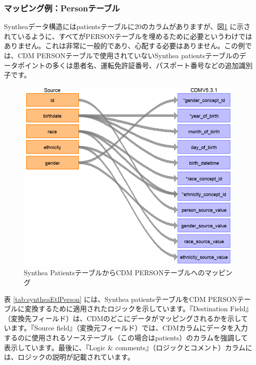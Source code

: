 \documentclass[
  11pt]{book}
\theoremstyle{definition}
\theoremstyle{definition}
\theoremstyle{definition}
\theoremstyle{definition}
\theoremstyle{remark}
\begin{document}
\subsubsection*{マッピング例：Personテーブル}\label{ux30deux30c3ux30d4ux30f3ux30b0ux4f8bpersonux30c6ux30fcux30d6ux30eb}

Syntheaデータ構造にはpatientsテーブルに20のカラムがありますが、図\ref{fig:syntheaPerson} に示されているように、すべてがPERSONテーブルを埋めるために必要というわけではありません。これは非常に一般的であり、心配する必要はありません。この例では、CDM PERSONテーブルで使用されていないSynthea patientsテーブルのデータポイントの多くは患者名、運転免許証番号、パスポート番号などの追加識別子です。

\begin{figure}

{\centering \includegraphics[width=1\linewidth]{images/ExtractTransformLoad/syntheaPersonTable} 

}

\caption{Synthea PatientsテーブルからCDM PERSONテーブルへのマッピング}\label{fig:syntheaPerson}
\end{figure}

表 \ref{tab:syntheaEtlPerson} には、Synthea patientsテーブルをCDM PERSONテーブルに変換するために適用されたロジックを示しています。『Destination Field』（変換先フィールド）は、CDMのどこにデータがマッピングされるかを示しています。『Source field』（変換元フィールド）では、CDMカラムにデータを入力するのに使用されるソーステーブル（この場合はpatients）のカラムを強調して表示しています。最後に、『Logic \& comments』（ロジックとコメント）カラムには、ロジックの説明が記載されています。
\end{document}
